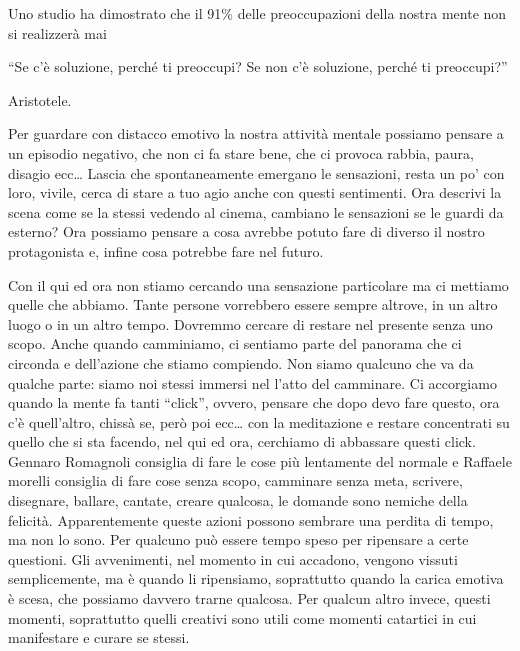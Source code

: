 \documentclass[12pt]{book} %
\begin{document}
Uno studio ha dimostrato che il 91\% delle preoccupazioni della nostra mente non si realizzerà
mai


\bigskip

“Se c'è soluzione, perché ti preoccupi? Se non c'è soluzione, perché ti
preoccupi?”

Aristotele.


\bigskip

Per guardare con distacco emotivo la nostra attività mentale possiamo pensare a un episodio negativo, che non ci fa
stare bene, che ci provoca rabbia, paura, disagio ecc… Lascia che spontaneamente emergano le sensazioni, resta un
po' con loro, vivile, cerca di stare a tuo agio anche con questi sentimenti. Ora descrivi la scena
come se la stessi vedendo al cinema, cambiano le sensazioni se le guardi da esterno? Ora possiamo pensare a cosa
avrebbe potuto fare di diverso il nostro protagonista e, infine cosa potrebbe fare nel futuro.


\bigskip

Con il qui ed ora non stiamo cercando una sensazione particolare ma ci mettiamo quelle che abbiamo. Tante persone
vorrebbero essere sempre altrove, in un altro luogo o in un altro tempo. Dovremmo cercare di restare nel presente senza
uno scopo. Anche quando camminiamo, ci sentiamo parte del panorama che ci circonda e dell'azione che stiamo compiendo.
Non siamo qualcuno che va da qualche parte: siamo noi stessi immersi nel l'atto del camminare. Ci accorgiamo quando la
mente fa tanti “click”, ovvero, pensare che dopo devo fare questo, ora c'è quell'altro, chissà se,
però poi ecc… con la meditazione e restare concentrati su quello che si sta facendo, nel qui ed ora, cerchiamo di
abbassare questi click. Gennaro Romagnoli consiglia di fare le cose più lentamente del normale e Raffaele morelli
consiglia di fare cose senza scopo, camminare senza meta, scrivere, disegnare, ballare, cantate, creare qualcosa, le
domande sono nemiche della felicità. Apparentemente queste azioni possono sembrare una perdita di tempo, ma non lo
sono. Per qualcuno può essere tempo speso per ripensare a certe questioni. Gli avvenimenti, nel momento in cui
accadono, vengono vissuti semplicemente, ma è quando li ripensiamo, soprattutto quando la carica emotiva è scesa, che
possiamo davvero trarne qualcosa. Per qualcun altro invece, questi momenti, soprattutto quelli creativi sono utili come
momenti catartici in cui manifestare e curare se stessi.
\end{document}
